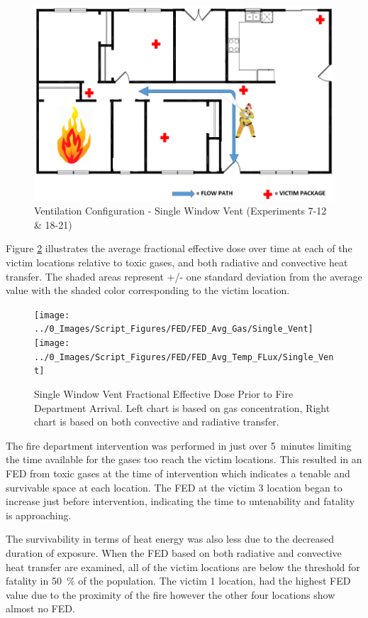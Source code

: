 \documentclass[12pt,oneside]{book}
\begin{document}
\begin{figure}[H]
	\centering
	\includegraphics[width=.65\textwidth]{Figures/General/No_Vent_interior_config.png}
	\caption{Ventilation Configuration - Single Window Vent (Experiments 7-12 \& 18-21)}
	\label{fig:Vent_Profile-Single_Vent}
\end{figure}

Figure \ref{fig:FED_SingleVent} illustrates the average fractional effective dose over time at each of the victim locations relative to toxic gases, and both radiative and convective heat transfer. The shaded areas represent +/- one standard deviation from the average value with the shaded color corresponding to the victim location. 

\begin{figure}[H]
	\centering
	\texttt{[image: ../0\_Images/Script\_Figures/FED/FED\_Avg\_Gas/Single\_Vent]}
	\texttt{[image: ../0\_Images/Script\_Figures/FED/FED\_Avg\_Temp\_FLux/Single\_Vent]}
	\caption[Single Window Vent Fractional Effective Dose]{Single Window Vent Fractional Effective Dose Prior to Fire Department Arrival. Left chart is based on gas concentration, Right chart is based on both convective and radiative transfer.}
	\label{fig:FED_SingleVent}
\end{figure}

The fire department intervention was performed in just over 5~minutes limiting the time available for the gases too reach the victim locations. This resulted in an FED from toxic gases at the time of intervention which indicates a tenable and survivable space at each location. The FED at the victim 3 location began to increase just before intervention, indicating the time to untenability and fatality is approaching. 

The survivability in terms of heat energy was also less due to the decreased duration of exposure. When the FED based on both radiative and convective heat transfer are examined, all of the victim locations are below the threshold for fatality in 50~\% of the population. The victim 1 location, had the highest FED value due to the proximity of the fire however the other four locations show almost no FED. 
\end{document}
